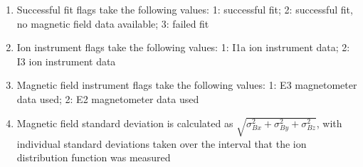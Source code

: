 \documentclass[11pt,a4paper]{article}
\begin{document}
\begin{table}
\begin{enumerate}
		\item Successful fit flags take the following values: 1: successful fit; 2: successful fit, no magnetic field data available; 3: failed fit
		\item Ion instrument flags take the following values: 1: I1a ion instrument data;  2: I3 ion instrument data
		\item Magnetic field instrument flags take the following values: 1: E3 magnetometer data used;  2: E2 magnetometer data used
		\item Magnetic field standard deviation is calculated as $\sqrt{\sigma^{2}_{Bx} + \sigma^{2}_{By} + \sigma^{2}_{Bz}}$, with individual standard deviations taken over the interval that the ion distribution function was measured
	\end{enumerate}
\end{table}

\end{document}
